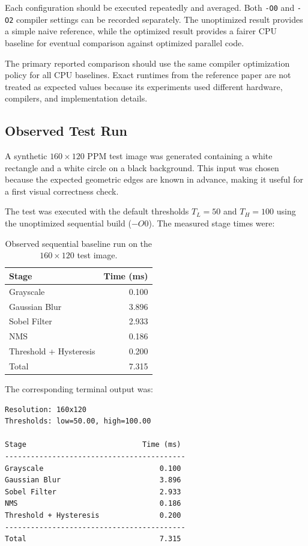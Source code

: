 \documentclass[conference]{IEEEtran}
\begin{document}
Each configuration should be executed repeatedly and averaged. Both
\texttt{-O0} and \texttt{-O2} compiler settings can be recorded separately.
The unoptimized result provides a simple naive reference, while the
optimized result provides a fairer CPU baseline for eventual comparison
against optimized parallel code.

The primary reported comparison should use the same compiler optimization
policy for all CPU baselines. Exact runtimes from the reference paper are
not treated as expected values because its experiments used different
hardware, compilers, and implementation details.


\subsection{Observed Test Run}

A synthetic $160\times120$ PPM test image was generated containing a white
rectangle and a white circle on a black background. This input was chosen
because the expected geometric edges are known in advance, making it useful
for a first visual correctness check.

The test was executed with the default thresholds $T_L=50$ and $T_H=100$
using the unoptimized sequential build ($-O0$). The measured stage times were:

\begin{table}[H]
\centering
\caption{Observed sequential baseline run on the $160\times120$ test image.}
\begin{tabular}{l r}
\toprule
Stage & Time (ms)\\
\midrule
Grayscale & 0.100\\
Gaussian Blur & 3.896\\
Sobel Filter & 2.933\\
NMS & 0.186\\
Threshold + Hysteresis & 0.200\\
\midrule
Total & 7.315\\
\bottomrule
\end{tabular}
\end{table}

The corresponding terminal output was:

\begin{lstlisting}
Resolution: 160x120
Thresholds: low=50.00, high=100.00

Stage                           Time (ms)
------------------------------------------
Grayscale                           0.100
Gaussian Blur                       3.896
Sobel Filter                        2.933
NMS                                 0.186
Threshold + Hysteresis              0.200
------------------------------------------
Total                               7.315
\end{lstlisting}
\end{document}
